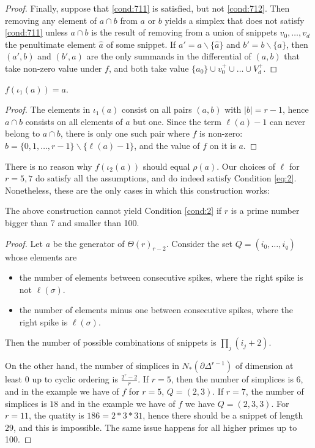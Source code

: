 \begin{proof}
		Finally, suppose that \eqref{cond:711} is satisfied, but not \eqref{cond:712}. Then removing any element of $a\cap b$ from $a$ or $b$ yields a simplex that does not satisfy \eqref{cond:711} unless $a\cap b$ is the result of removing from a union of snippets $v_0,\ldots,v_d$ the penultimate element $\hat{a}$ of some snippet. If $a' = a\smallsetminus \{\hat{a}\}$ and $b' = b\smallsetminus \{a\}$, then $(a',b)$ and $(b',a)$ are the only summands in the differential of $(a,b)$ that take non-zero value under $f$, and both take value $\{a_0\}\cup v_0^+\cup \ldots \cup V_d^+$.
	\end{proof}
	\begin{lemma} $f(\iota_1(a)) = a$.
	\end{lemma}
	\begin{proof} The elements in $\iota_1(a)$ consist on all pairs $(a,b)$ with $|b|=r-1$, hence $a\cap b$ consists on all elements of $a$ but one. Since the term $\ell(a)-1$ can never belong to $a\cap b$, there is only one such pair where $f$ is non-zero: $b = \{0,1,\ldots,r-1\}\smallsetminus \{\ell(a)-1\}$, and the value of $f$ on it is $a$.
	\end{proof}
	\begin{remark} There is no reason why $f(\iota_2(a))$ should equal $\rho(a)$. Our choices of $\ell$ for $r=5,7$ do satisfy all the assumptions, and do indeed satisfy Condition \eqref{eq:2}. Nonetheless, these are the only cases in which this construction works:
	\end{remark}
	\begin{lemma} The above construction cannot yield Condition \eqref{cond:2} if $r$ is a prime number bigger than 7 and smaller than 100.
	\end{lemma}
	\begin{proof}
		Let $a$ be the generator of $\Theta(r)_{r-2}$. Consider the set $Q=(i_0,\ldots,i_q)$ whose elements are
		\begin{itemize}
			\item the number of elements between consecutive spikes, where the right spike is not $\ell(\sigma)$.
			\item the number of elements minus one between consecutive spikes, where the right spike is $\ell(\sigma)$.
		\end{itemize}
		Then the number of possible combinations of snippets is $\prod_j{(i_j+2)}$.

		On the other hand, the number of simplices in $N_*(\partial\Delta^{r-1})$ of dimension at least $0$ up to cyclic ordering is $\frac{2^r-2}{r}$. If $r=5$, then the number of simplices is $6$, and in the example we have of $f$ for $r=5$, $Q=(2,3)$. If $r=7$, the number of simplices is $18$ and in the example we have of $f$ we have $Q=(2,3,3)$. For $r=11$, the quatity is $186 = 2*3*31$, hence there should be a snippet of length $29$, and this is impossible. The same issue happens for all higher primes up to 100.
	\end{proof}
